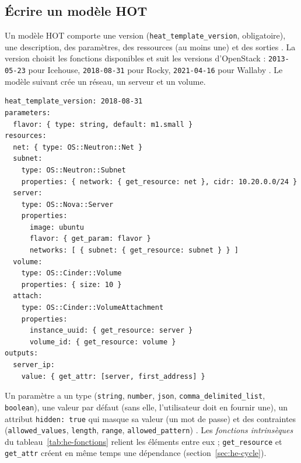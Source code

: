 \subsection{Écrire un modèle HOT}\label{sec:he-modele}

Un modèle HOT comporte une version (\texttt{heat\_\allowbreak template\_\allowbreak version}, obligatoire), une description, des
paramètres, des ressources (au moins une) et des sorties \parencite{heat-hello-world}. La version choisit les fonctions
disponibles et suit les versions d'OpenStack : \texttt{2013-05-23} pour Icehouse, \texttt{2018-08-31} pour Rocky,
\texttt{2021-04-16} pour Wallaby \parencite{heat-hot-spec}. Le modèle suivant crée un réseau, un serveur et un volume.

\par\noindent\begin{minipage}{\linewidth}
\begin{lstlisting}
heat_template_version: 2018-08-31
parameters:
  flavor: { type: string, default: m1.small }
resources:
  net: { type: OS::Neutron::Net }
  subnet:
    type: OS::Neutron::Subnet
    properties: { network: { get_resource: net }, cidr: 10.20.0.0/24 }
  server:
    type: OS::Nova::Server
    properties:
      image: ubuntu
      flavor: { get_param: flavor }
      networks: [ { subnet: { get_resource: subnet } } ]
  volume:
    type: OS::Cinder::Volume
    properties: { size: 10 }
  attach:
    type: OS::Cinder::VolumeAttachment
    properties:
      instance_uuid: { get_resource: server }
      volume_id: { get_resource: volume }
outputs:
  server_ip:
    value: { get_attr: [server, first_address] }
\end{lstlisting}
\end{minipage}\par

Un paramètre a un type (\texttt{string}, \texttt{number}, \texttt{json}, \texttt{comma\_\allowbreak delimited\_\allowbreak list},
\texttt{boolean}), une valeur par défaut (sans elle, l'utilisateur doit en fournir une), un attribut \texttt{hidden: true} qui
masque sa valeur (un mot de passe) et des contraintes (\texttt{allowed\_\allowbreak values}, \texttt{length}, \texttt{range},
\texttt{allowed\_\allowbreak pattern}) \parencite{heat-hello-world}. Les \emph{fonctions intrinsèques} du tableau~\ref{tab:he-fonctions}
relient les éléments entre eux ; \texttt{get\_resource} et \texttt{get\_attr} créent en même temps une dépendance
(section~\ref{sec:he-cycle}).

